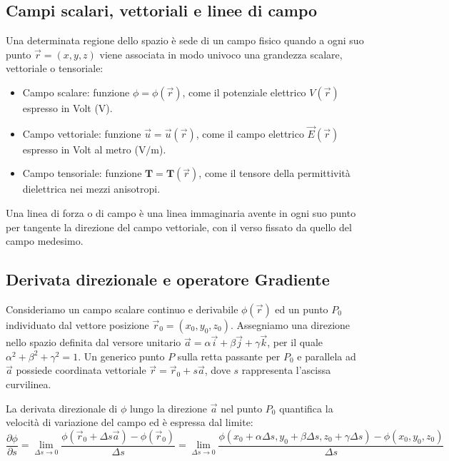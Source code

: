 \documentclass[12pt, a4paper]{article}
\begin{document}
\subsection{Campi scalari, vettoriali e linee di campo}

Una determinata regione dello spazio è sede di un campo fisico quando a ogni suo punto $\vec{r} = (x, y, z)$ viene associata in modo univoco una grandezza scalare, vettoriale o tensoriale:
\begin{itemize}
    \item Campo scalare: funzione $\phi = \phi(\vec{r})$, come il potenziale elettrico $V(\vec{r})$ espresso in Volt ($\text{V}$).
    \item Campo vettoriale: funzione $\vec{u} = \vec{u}(\vec{r})$, come il campo elettrico $\vec{E}(\vec{r})$ espresso in Volt al metro ($\text{V/m}$).
    \item Campo tensoriale: funzione $\mathbf{T} = \mathbf{T}(\vec{r})$, come il tensore della permittività dielettrica nei mezzi anisotropi.
\end{itemize}

Una linea di forza o di campo è una linea immaginaria avente in ogni suo punto per tangente la direzione del campo vettoriale, con il verso fissato da quello del campo medesimo.

\subsection{Derivata direzionale e operatore Gradiente}

Consideriamo un campo scalare continuo e derivabile $\phi(\vec{r})$ ed un punto $P_0$ individuato dal vettore posizione $\vec{r}_0 = (x_0, y_0, z_0)$. Assegniamo una direzione nello spazio definita dal versore unitario $\vec{a} = \alpha \vec{i} + \beta \vec{j} + \gamma \vec{k}$, per il quale $\alpha^2 + \beta^2 + \gamma^2 = 1$.
Un generico punto $P$ sulla retta passante per $P_0$ e parallela ad $\vec{a}$ possiede coordinata vettoriale $\vec{r} = \vec{r}_0 + s \vec{a}$, dove $s$ rappresenta l'ascissa curvilinea.

La derivata direzionale di $\phi$ lungo la direzione $\vec{a}$ nel punto $P_0$ quantifica la velocità di variazione del campo ed è espressa dal limite:
\[
\frac{\partial \phi}{\partial s} = \lim_{\Delta s \to 0} \frac{\phi(\vec{r}_0 + \Delta s \vec{a}) - \phi(\vec{r}_0)}{\Delta s} = \lim_{\Delta s \to 0} \frac{\phi(x_0+\alpha\Delta s, y_0+\beta\Delta s, z_0+\gamma\Delta s) - \phi(x_0, y_0, z_0)}{\Delta s}
\]
\end{document}
